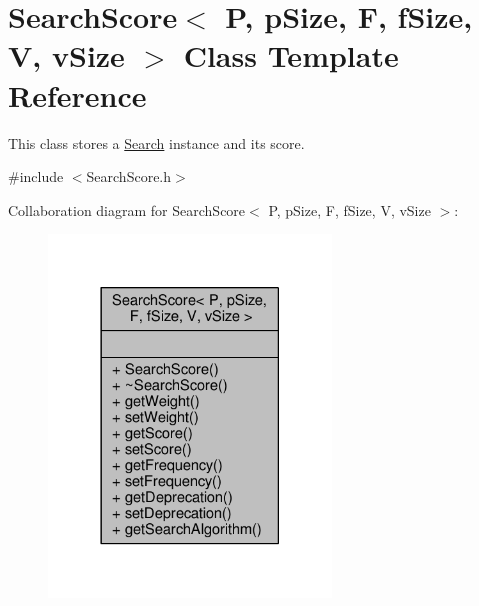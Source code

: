 \hypertarget{classSearchScore}{}\section{Search\+Score$<$ P, p\+Size, F, f\+Size, V, v\+Size $>$ Class Template Reference}
\label{classSearchScore}


This class stores a \hyperlink{classSearch}{Search} instance and its score.  




{\ttfamily \#include $<$Search\+Score.\+h$>$}



Collaboration diagram for Search\+Score$<$ P, p\+Size, F, f\+Size, V, v\+Size $>$\+:\nopagebreak
\begin{figure}[H]
\begin{center}
\leavevmode
\includegraphics[width=213pt]{classSearchScore__coll__graph}
\end{center}
\end{figure}
